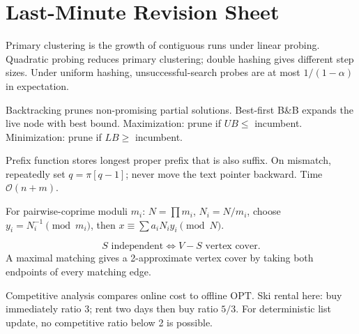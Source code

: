 \documentclass[11pt,a4paper]{article}
\newcommand{\Oh}{\mathcal{O}}
\newcommand{\OPT}{\mathrm{OPT}}
\begin{document}
\clearpage
\section*{Last-Minute Revision Sheet}

\begin{pointbox}[Hashing]
Primary clustering is the growth of contiguous runs under linear probing. Quadratic probing reduces primary clustering; double hashing gives different step sizes. Under uniform hashing, unsuccessful-search probes are at most \(1/(1-\alpha)\) in expectation.
\end{pointbox}

\begin{pointbox}
Backtracking prunes non-promising partial solutions. Best-first B\&B expands the live node with best bound. Maximization: prune if \(UB\le\) incumbent. Minimization: prune if \(LB\ge\) incumbent.
\end{pointbox}

\begin{pointbox}[KMP]
Prefix function stores longest proper prefix that is also suffix. On mismatch, repeatedly set \(q=\pi[q-1]\); never move the text pointer backward. Time \(\Oh(n+m)\).
\end{pointbox}

\begin{pointbox}[CRT]
For pairwise-coprime moduli \(m_i\): \(N=\prod m_i\), \(N_i=N/m_i\), choose \(y_i=N_i^{-1}\pmod{m_i}\), then \(x\equiv\sum a_iN_iy_i\pmod N\).
\end{pointbox}

\begin{pointbox}
\[
S\text{ independent}\iff V-S\text{ vertex cover}.
\]
A maximal matching gives a 2-approximate vertex cover by taking both endpoints of every matching edge.
\end{pointbox}

\begin{pointbox}
Competitive analysis compares online cost to offline \(\OPT\). Ski rental here: buy immediately ratio 3; rent two days then buy ratio \(5/3\). For deterministic list update, no competitive ratio below 2 is possible.
\end{pointbox}
\end{document}
